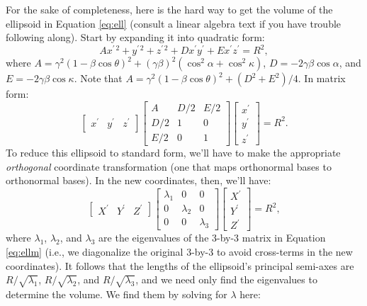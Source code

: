\documentclass[12pt]{article}
\begin{document}
For the sake of completeness, here is the hard way to get the volume of the ellipsoid in Equation \ref{eq:ell} (consult a linear algebra text if you have trouble following along). Start by expanding it into quadratic form:
\begin{equation*}
Ax^{\prime \, 2} + y^{\prime \, 2} + z^{\prime \, 2} + D x^\prime y^\prime + E x^\prime z^\prime = R^2,
\end{equation*}
where $A = \gamma^2 (1 - \beta \cos \theta)^2 + (\gamma \beta)^2 ( \cos^2 \alpha + \cos^2 \kappa )$, $D = -2 \gamma \beta \cos \alpha$, and $E = -2 \gamma \beta \cos \kappa$. Note that $A = \gamma^2 (1 - \beta \cos \theta)^2 + (D^2 + E^2)/4$. In matrix form:
\begin{equation}\label{eq:ellm}
\begin{bmatrix}
x^\prime & y^\prime & z^\prime
\end{bmatrix}
\begin{bmatrix}
A & D/2 & E/2 \\
D/2 & 1 & 0 \\
E/2 & 0 & 1
\end{bmatrix}
\begin{bmatrix}
x^\prime \\
y^\prime \\
z^\prime
\end{bmatrix}
= R^2 .
\end{equation}
To reduce this ellipsoid to standard form, we'll have to make the appropriate \emph{orthogonal} coordinate transformation (one that maps orthonormal bases to orthonormal bases). In the new coordinates, then, we'll have:
\begin{equation*}
\begin{bmatrix}
X^\prime & Y^\prime & Z^\prime
\end{bmatrix}
\begin{bmatrix}
\lambda_1 & 0 & 0 \\
0 & \lambda_2 & 0 \\
0 & 0 & \lambda_3
\end{bmatrix}
\begin{bmatrix}
X^\prime \\
Y^\prime \\
Z^\prime
\end{bmatrix}
= R^2 ,
\end{equation*}
where $\lambda_1$, $\lambda_2$, and $\lambda_3$ are the eigenvalues of the 3-by-3 matrix in Equation \ref{eq:ellm} (i.e., we diagonalize the original 3-by-3 to avoid cross-terms in the new coordinates). It follows that the lengths of the ellipsoid's principal semi-axes are $R / \sqrt{\lambda_1}$, $R / \sqrt{\lambda_2}$, and $R / \sqrt{\lambda_3}$, and we need only find the eigenvalues to determine the volume. We find them by solving for $\lambda$ here:
\end{document}
